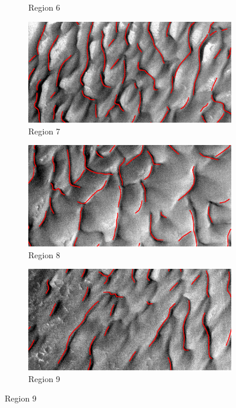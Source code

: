 \begin{figure}[htbp]
\begin{subfigure}[b]{0.3\textwidth}
		\caption{  Region 6 }
		\label{fig:area6_image}
	\end{subfigure}
	\begin{subfigure}[b]{0.3\textwidth}
		\centering
		\includegraphics[width=\textwidth]{figures/area7_with_gt}
		\caption{  Region 7 }
		\label{fig:area7_image}
	\end{subfigure}
	\begin{subfigure}[b]{0.3\textwidth}
		\centering
		\includegraphics[width=\textwidth]{figures/area8_with_gt}
		\caption{  Region 8 }
		\label{fig:area8_image}
	\end{subfigure}
	\begin{subfigure}[b]{0.3\textwidth}
		\centering
		\includegraphics[width=\textwidth]{figures/area9_with_gt}
		\caption{  Region 9 }
		\label{fig:area9_image}
	\end{subfigure}


\end{figure}
